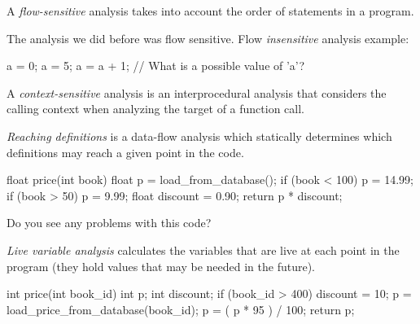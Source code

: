 \documentclass{article}
\begin{document}
\plush{}


A \emph{flow-sensitive} analysis takes into account the order of statements in a program.

The analysis we did before was flow sensitive. Flow \emph{insensitive} analysis example:

{\small
\begin{ffcode}
a = 0;
a = 5;
a = a + 1;
// What is a possible value of 'a'?
\end{ffcode}
}

\plush{}


A \emph{context-sensitive} analysis is an interprocedural analysis that considers the calling context when analyzing the target of a function call.

{\small
{}
}

\plush{}



\emph{Reaching definitions} is a data-flow analysis which statically determines which definitions may reach a given point in the code.

{\small
\begin{ffcode}
float price(int book) {
  float p = load_from_database();
  if (book < 100)
    p = 14.99;
  if (book > 50)
    p = 9.99;
  float discount = 0.90;
  return p * discount;
}
\end{ffcode}
}

Do you see any problems with this code?

\plush{}


\emph{Live variable analysis} calculates the variables that are live at each point in the program (they hold values that may be needed in the future).

{\small
\begin{ffcode}
int price(int book_id) {
  int p;
  int discount;
  if (book_id > 400)
    discount = 10;
  p = load_price_from_database(book_id);
  p = ( p * 95 ) / 100;
  return p;
}
\end{ffcode}
}
\end{document}
